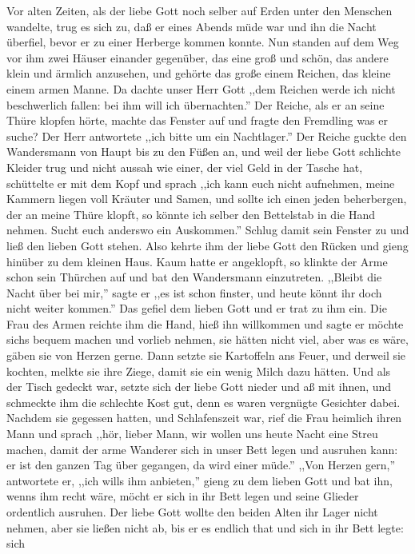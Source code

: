 \documentclass[10pt,a4paper]{article}
\begin{document}
\vskip 4pt
Vor alten Zeiten, als der liebe Gott noch selber auf Erden unter den Menschen
wandelte, trug es sich zu, daß er eines Abends müde war und ihn die Nacht
überfiel, bevor er zu einer Herberge kommen konnte. Nun standen auf dem Weg vor
ihm zwei Häuser einander gegenüber, das eine groß und schön, das andere klein
und ärmlich anzusehen, und gehörte das große einem Reichen, das kleine einem
armen Manne. Da dachte unser Herr Gott ,,dem Reichen werde ich nicht
beschwerlich fallen: bei ihm will ich übernachten.'' Der Reiche, als er an seine
Thüre klopfen hörte, machte das Fenster auf und fragte den Fremdling was er
suche? Der Herr antwortete ,,ich bitte um ein Nachtlager.'' Der Reiche guckte
den Wandersmann von Haupt bis zu den Füßen an, und weil der liebe Gott schlichte
Kleider trug und nicht aussah wie einer, der viel Geld in der Tasche hat,
schüttelte er mit dem Kopf und sprach ,,ich kann euch nicht aufnehmen, meine
Kammern liegen voll Kräuter und Samen, und sollte ich einen jeden beherbergen,
der an meine Thüre klopft, so könnte ich selber den Bettelstab in die Hand
nehmen. Sucht euch anderswo ein Auskommen.'' Schlug damit sein Fenster zu und
ließ den lieben Gott stehen. Also kehrte ihm der liebe Gott den Rücken und gieng
hinüber zu dem kleinen Haus. Kaum hatte er angeklopft, so klinkte der Arme schon
sein Thürchen auf und bat den Wandersmann einzutreten. ,,Bleibt die Nacht über
bei mir,'' sagte er ,,es ist schon finster, und heute könnt ihr doch nicht weiter
kommen.'' Das gefiel dem lieben Gott und er trat zu ihm ein. Die Frau des Armen
reichte ihm die Hand, hieß ihn willkommen und sagte er möchte sichs bequem
machen und vorlieb nehmen, sie hätten nicht viel, aber was es wäre, gäben sie
von Herzen gerne. Dann setzte sie Kartoffeln ans Feuer, und derweil sie kochten,
melkte sie ihre Ziege, damit sie ein wenig Milch dazu hätten. Und als der Tisch
gedeckt war, setzte sich der liebe Gott nieder und aß mit ihnen, und schmeckte
ihm die schlechte Kost gut, denn es waren vergnügte Gesichter dabei. Nachdem sie
gegessen hatten, und Schlafenszeit war, rief die Frau heimlich ihren Mann und
sprach ,,hör, lieber Mann, wir wollen uns heute Nacht eine Streu machen, damit
der arme Wanderer sich in unser Bett legen und ausruhen kann: er ist den ganzen
Tag über gegangen, da wird einer müde.'' ,,Von Herzen gern,'' antwortete er,
,,ich wills ihm anbieten,'' gieng zu dem lieben Gott und bat ihn, wenns ihm
recht wäre, möcht er sich in ihr Bett legen und seine Glieder ordentlich
ausruhen. Der liebe Gott wollte den beiden Alten ihr Lager nicht nehmen, aber
sie ließen nicht ab, bis er es endlich that und sich in ihr Bett legte: sich
\end{document}
